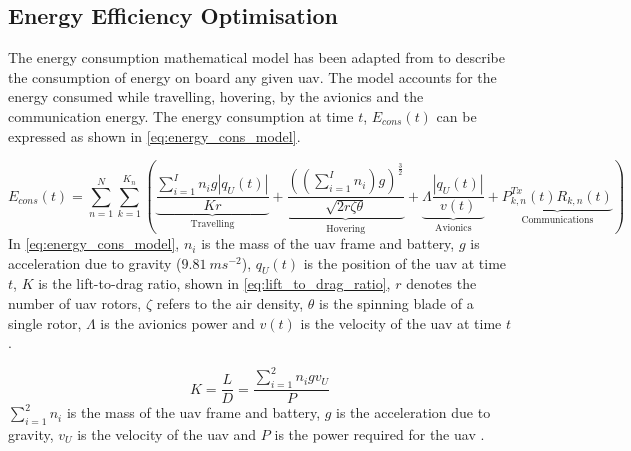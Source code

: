 \subsection{Energy Efficiency Optimisation}
The energy consumption mathematical model has been adapted from \cite{silvirianti_layerwise_2024} to describe the consumption of energy on board any given \acrshort{uav}. The model accounts for the energy consumed while travelling, hovering, by the avionics and the communication energy. 
The energy consumption at time $t$, $E_{cons}(t)$ can be expressed as shown in \ref{eq:energy_cons_model}.

\begin{equation} \label{eq:energy_cons_model}
    E_{cons}(t) = \sum_{n=1}^{N} \sum_{k=1}^{K_n} \left (\underbrace{\frac{\sum_{i=1}^{I} n_{i} g |q_{U}(t)|}{K\textit{r}}}_{\text{Travelling}} + 
    \underbrace{\frac{((\sum_{i=1}^{I}n_i)g)^{\frac{3}{2}}}{\sqrt{2 r \zeta \theta}}}_{\text{Hovering}} +
    \underbrace{\Lambda \frac{|q_{U}(t)|}{v(t)}}_{\text{Avionics}} + 
    \underbrace{P_{k, n}^{Tx}(t) R_{k, n}(t)}_{\text{Communications}} \right)
\end{equation}
In \ref{eq:energy_cons_model}, $n_{i}$ is the mass of the \acrshort{uav} frame and battery, $g$ is acceleration due to gravity ($9.81\ m s^{-2}$), $q_{U}(t)$ is the position of the \acrshort{uav} at time $t$, $K$ is the lift-to-drag ratio, shown in \ref{eq:lift_to_drag_ratio}, $r$ denotes the number of \acrshort{uav} rotors, $\zeta$ refers to the air density, $\theta$ is the spinning blade of a single rotor, $\Lambda$ is the avionics power and $v(t)$ is the velocity of the \acrshort{uav} at time $t$ \cite{silvirianti_layerwise_2024, zhang_energy_2021}. 

\begin{equation} \label{eq:lift_to_drag_ratio}
   K = \frac{L}{D} = \frac{\sum_{i=1}^2 n_{i} g v_{U}}{P}
\end{equation}
$\sum_{i=1}^2 n_{i}$ is the mass of the \acrshort{uav} frame and battery, $g$ is the acceleration due to gravity, $v_{U}$ is the velocity of the \acrshort{uav} and $P$ is the power required for the \acrshort{uav} \cite{theys_forward_2020}. 

